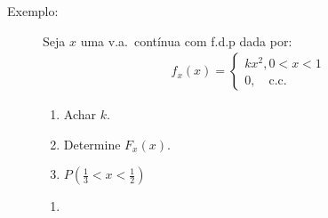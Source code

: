    \begin{description}

     \item [Exemplo:] 
       Seja $x$ uma v.a.\ contínua com f.d.p dada por:
       \begin{align*}
         f_{x}(x) = 
         \begin{cases} 
           k x^2, 0 < x < 1 \\
           0, \quad \text{c.c.\ }
         \end{cases}
       \end{align*}
       \begin{enumerate}[label=(\alph*)]
         \item Achar $k$.
         \item Determine ${F}_{x} (x)$.
         \item $P (\frac{1}{3} < x < \frac{1}{2})$
       \end{enumerate} 

       \begin{enumerate}[label=(\alph*)]
         \item 


\end{enumerate}
\end{description}
